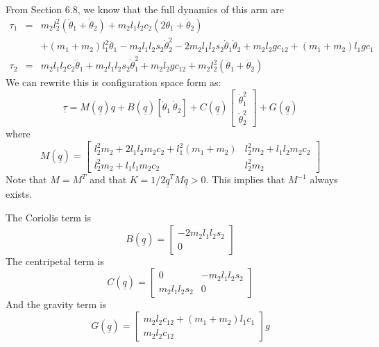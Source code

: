 \documentclass[fleqn]{article}
\begin{document}
From Section 6.8, we know that the full dynamics of this arm are
\begin{eqnarray}
	\tau_{1} & = & m_{2}l_{2}^{2}(\ddot{\theta}_{1}+\ddot{\theta}_{2}) + m_{2}l_{1}l_{2}c_{2}(2\ddot{\theta}_{1} + \ddot{\theta}_{2}) \nonumber \\
	&&+(m_{1}+m_{2})l_{1}^{2}\ddot{\theta}_{1}-m_{2}l_{1}l_{2}s_{2}\dot{\theta}_{2}^{2} - 2m_{2}l_{1}l_{2}s_{2}\dot{\theta}_{1}\dot{\theta}_{2} + m_{2}l_{2}gc_{12}+(m_{1}+m_{2})l_{1}gc_{1} \nonumber \\
	\tau_{2} & = & m_{2}l_{1}l_{2}c_{2}\ddot{\theta}_{1}+m_{2}l_{1}l_{2}s_{2}\dot{\theta}_{1}^{2} + m_{2}l_{2}gc_{12}+m_{2}l_{2}^{2}(\ddot{\theta}_{1}+\ddot{\theta}_{2}) \nonumber
\end{eqnarray}
We can rewrite this is configuration space form as:
\begin{equation}
\underline{\tau} = M(\underline{q})\ddot{q} + B(\underline{q})\left[\dot{\theta}_{1}\ \dot{\theta}_{2}\right] + C(\underline{q})\left[\begin{array}{c} \dot{\theta}_{1}^{2} \\ \dot{\theta}_{2}^{2} \end{array}\right] +G(\underline{q}) \nonumber
\end{equation}
where
\begin{displaymath}
M(\underline{q}) = \left[\begin{array}{ll} l_{2}^{2}m_{2}+2l_{1}l_{2}m_{2}c_{2}+l_{1}^{2}(m_{1}+m_{2}) & l_{2}^{2}m_{2}+l_{1}l_{2}m_{2}c_{2} \\ l_{2}^{2}m_{2}+l_{1}l_{1}m_{2}c_{2} & l_{2}^{2}m_{2} \end{array} \right]
\end{displaymath}
Note that $M=M^{T}$ and that $K=1/2\underline{\dot{q}}^{T}M\underline{\dot{q}}>0$. This implies that $M^{-1}$ always exists.

The Coriolis term is
\begin{displaymath}
B(\underline{q}) = \left[\begin{array}{c} -2m_{2}l_{1}l_{2}s_{2} \\ 0 \end{array}\right]
\end{displaymath}
The centripetal term is
\begin{displaymath}
C(\underline{q}) = \left[ \begin{array}{cc} 0 & -m_{2}l_{1}l_{2}s_{2} \\ m_{2}l_{1}l_{2}s_{2} & 0 \end{array} \right]
\end{displaymath}
And the gravity term is
\begin{displaymath}
G(\underline{q}) = \left[ \begin{array}{c} m_{2}l_{2}c_{12} + (m_{1}+m_{2})l_{1}c_{1} \\ m_{2}l_{2}c_{12} \end{array} \right]g
\end{displaymath}
\end{document}

